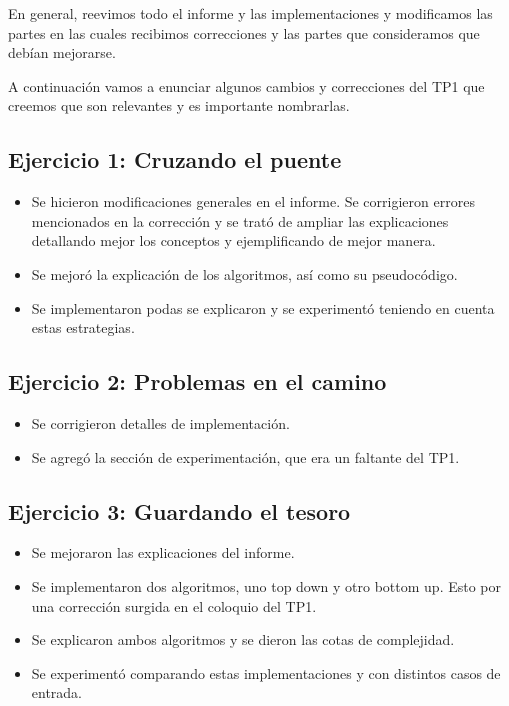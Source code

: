 \par En general, reevimos todo el informe y las implementaciones y modificamos las partes en las cuales recibimos correcciones y las partes que consideramos que debían mejorarse.

\par A continuación vamos a enunciar algunos cambios y correcciones del TP1 que creemos que son relevantes y es importante nombrarlas.

\subsection{Ejercicio 1: Cruzando el puente}

\begin{itemize}
	\item Se hicieron modificaciones generales en el informe. Se corrigieron errores mencionados en la corrección y se trató de ampliar las explicaciones detallando mejor los conceptos y ejemplificando de mejor manera.
	\item Se mejoró la explicación de los algoritmos, así como su pseudocódigo.
	\item Se implementaron podas se explicaron y se experimentó teniendo en cuenta estas estrategias.
\end{itemize}

\subsection{Ejercicio 2: Problemas en el camino}

\begin{itemize}
	\item Se corrigieron detalles de implementación.
	\item Se agregó la sección de experimentación, que era un faltante del TP1.
\end{itemize}

\subsection{Ejercicio 3: Guardando el tesoro}

\begin{itemize}
	\item Se mejoraron las explicaciones del informe.
	\item Se implementaron dos algoritmos, uno top down y otro bottom up. Esto por una corrección surgida en el coloquio del TP1.
	\item Se explicaron ambos algoritmos y se dieron las cotas de complejidad.
	\item Se experimentó comparando estas implementaciones y con distintos casos de entrada.
\end{itemize}